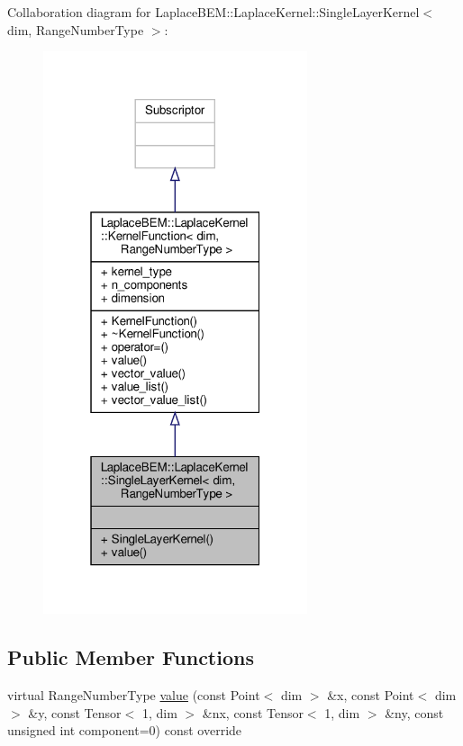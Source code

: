 Collaboration diagram for Laplace\+B\+EM\+:\+:Laplace\+Kernel\+:\+:Single\+Layer\+Kernel$<$ dim, Range\+Number\+Type $>$\+:\nopagebreak
\begin{figure}[H]
\begin{center}
\leavevmode
\includegraphics[width=220pt]{classLaplaceBEM_1_1LaplaceKernel_1_1SingleLayerKernel__coll__graph}
\end{center}
\end{figure}
\subsection*{Public Member Functions}
\begin{DoxyCompactItemize}
\item 
virtual Range\+Number\+Type \hyperlink{classLaplaceBEM_1_1LaplaceKernel_1_1SingleLayerKernel_a657e04bd67d8c33adeea1b9d282d6136}{value} (const Point$<$ dim $>$ \&x, const Point$<$ dim $>$ \&y, const Tensor$<$ 1, dim $>$ \&nx, const Tensor$<$ 1, dim $>$ \&ny, const unsigned int component=0) const override
\end{DoxyCompactItemize}
